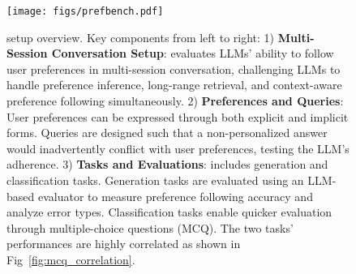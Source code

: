 \begin{figure}[t]
    \centering
    \texttt{[image: figs/prefbench.pdf]}
\caption{\ours{} setup overview. Key components from left to right: 1) \textbf{Multi-Session Conversation Setup}: \ours{} evaluates LLMs' ability to follow user preferences in multi-session conversation, challenging LLMs to handle preference inference, long-range retrieval, and context-aware preference following simultaneously. 2) \textbf{Preferences and Queries}: User preferences can be expressed through both explicit and implicit forms. Queries are designed such that a non-personalized answer would inadvertently conflict with user preferences, testing the LLM's adherence. 3) \textbf{Tasks and Evaluations}: \ours{} includes generation and classification tasks. Generation tasks are evaluated using an LLM-based evaluator to measure preference following accuracy and analyze error types. Classification tasks enable quicker evaluation through multiple-choice questions (MCQ). The two tasks' performances are highly correlated as shown in Fig~\ref{fig:mcq_correlation}.}
    \label{fig:main_fig}
\end{figure}